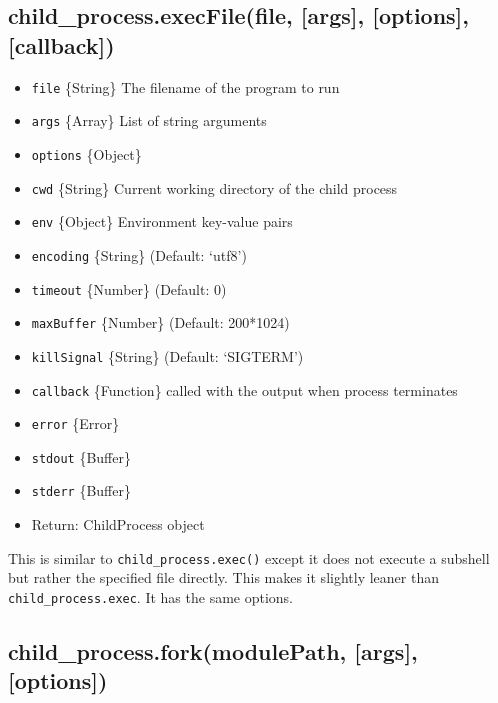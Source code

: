 \subsection{child\_process.execFile(file, {[}args{]}, {[}options{]},
{[}callback{]})}\label{childux5fprocess.execfilefile-args-options-callback}

\begin{itemize}
\itemsep1pt\parskip0pt
\item
  \texttt{file} \{String\} The filename of the program to run
\item
  \texttt{args} \{Array\} List of string arguments
\item
  \texttt{options} \{Object\}
\item
  \texttt{cwd} \{String\} Current working directory of the child process
\item
  \texttt{env} \{Object\} Environment key-value pairs
\item
  \texttt{encoding} \{String\} (Default: `utf8')
\item
  \texttt{timeout} \{Number\} (Default: 0)
\item
  \texttt{maxBuffer} \{Number\} (Default: 200*1024)
\item
  \texttt{killSignal} \{String\} (Default: `SIGTERM')
\item
  \texttt{callback} \{Function\} called with the output when process
  terminates
\item
  \texttt{error} \{Error\}
\item
  \texttt{stdout} \{Buffer\}
\item
  \texttt{stderr} \{Buffer\}
\item
  Return: ChildProcess object
\end{itemize}

This is similar to \texttt{child\_process.exec()} except it does not
execute a subshell but rather the specified file directly. This makes it
slightly leaner than \texttt{child\_process.exec}. It has the same
options.

\subsection{child\_process.fork(modulePath, {[}args{]},
{[}options{]})}\label{childux5fprocess.forkmodulepath-args-options}


